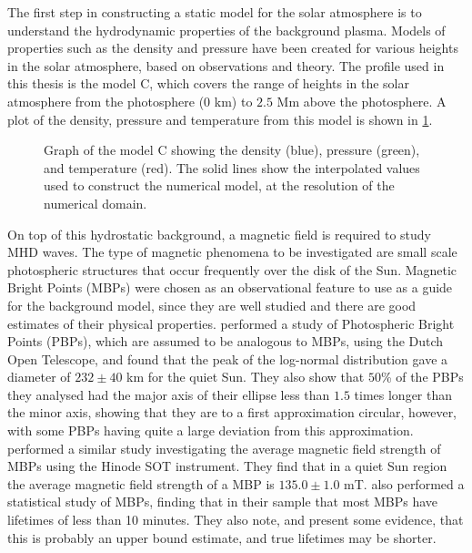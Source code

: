 \documentclass[a4paper,12pt,fourier,authoryear,custommargin]{Classes/PhDThesisPSnPDF}
\providecommand{\DIFaddtex}[1]{{\protect\color{blue}\uwave{#1}}} %
\providecommand{\DIFaddbegin}{} %
\providecommand{\DIFaddend}{} %
\providecommand{\DIFaddFL}[1]{\DIFadd{#1}} %
\providecommand{\DIFaddbeginFL}{} %
\providecommand{\DIFaddendFL}{} %
\providecommand{\DIFadd}[1]{\texorpdfstring{\DIFaddtex{#1}}{#1}} %
\begin{document}
The first step in constructing a static model for the solar atmosphere is to understand the hydrodynamic properties of the background plasma.
Models of properties such as the density and pressure have been created for various heights in the solar atmosphere, based on observations and theory.
The profile used in this thesis is the\DIFaddbegin \DIFadd{~}\DIFaddend \cite{vernazza1981} model C, which covers the range of heights in the solar atmosphere from the photosphere ($0$ km) to $2.5$ Mm above the photosphere.
A plot of the density, pressure and temperature from this model is shown in \cref{fig:val3c}.



\begin{figure}[h]
    \centering
    \caption{Graph of the\DIFaddbeginFL \DIFaddFL{~}\DIFaddendFL \cite{vernazza1981} model C showing the density (blue), pressure (green), and temperature (red). The solid lines show the interpolated values used to construct the numerical model, at the resolution of the numerical domain.}
    \label{fig:val3c}
\end{figure}

On top of this hydrostatic background, a magnetic field is required to study MHD waves.
The type of magnetic phenomena to be investigated are small scale photospheric structures that occur frequently over the disk of the Sun.
Magnetic Bright Points (MBPs) were chosen as an observational feature to use as a guide for the background model, since they are well studied and there are good estimates of their physical properties.
\cite{feng2013} performed a study of Photospheric Bright Points (PBPs), which are assumed to be analogous to MBPs, using the Dutch Open Telescope, and found that the peak of the log-normal distribution gave a diameter of $232\pm40$ km for the quiet Sun.
They also show that $50$\% of the PBPs they analysed had the major axis of their ellipse less than $1.5$ times longer than the minor axis, showing that they are to a first approximation circular, however, with some PBPs having quite a large deviation from this approximation.
\cite{utz2013} performed a similar study investigating the average magnetic field strength of MBPs using the Hinode SOT instrument.
They find that in a quiet Sun region the average magnetic field strength of a MBP is $135.0 \pm 1.0$ mT.
\cite{sanchezalmeida2004} also performed a statistical study of MBPs, finding that in their sample that most MBPs have lifetimes of less than 10 minutes.
They also note, and present some evidence, that this is probably an upper bound estimate, and true lifetimes may be shorter.
\end{document}

